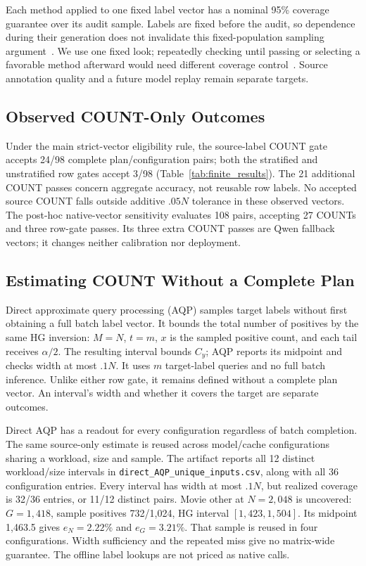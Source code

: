 Each method applied to one fixed label vector has a nominal 95\% coverage guarantee over its audit sample. Labels are fixed before the audit, so dependence during their generation does not invalidate this fixed-population sampling argument~\cite{worcs}. We use one fixed look; repeatedly checking until passing or selecting a favorable method afterward would need different coverage control~\cite{bargain}. Source annotation quality and a future model replay remain separate targets.



\subsection{Observed COUNT-Only Outcomes}
\label{sec:audit_results}
Under the main strict-vector eligibility rule, the source-label COUNT gate accepts 24/98 complete plan/configuration pairs; both the stratified and unstratified row gates accept 3/98 (Table~\ref{tab:finite_results}). The 21 additional COUNT passes concern aggregate accuracy, not reusable row labels. No accepted source COUNT falls outside additive $.05N$ tolerance in these observed vectors. The post-hoc native-vector sensitivity evaluates 108 pairs, accepting 27 COUNTs and three row-gate passes. Its three extra COUNT passes are Qwen fallback vectors; it changes neither calibration nor deployment.



\subsection{Estimating COUNT Without a Complete Plan}
Direct approximate query processing (AQP) samples target labels without first obtaining a full batch label vector. It bounds the total number of positives by the same HG inversion: $M=N$, $t=m$, $x$ is the sampled positive count, and each tail receives $\alpha/2$. The resulting interval bounds $C_y$; AQP reports its midpoint and checks width at most $.1N$. It uses $m$ target-label queries and no full batch inference. Unlike either row gate, it remains defined without a complete plan vector. An interval's width and whether it covers the target are separate outcomes.


Direct AQP has a readout for every configuration regardless of batch completion. The same source-only estimate is reused across model/cache configurations sharing a workload, size and sample. The artifact reports all 12 distinct workload/size intervals in \texttt{direct\_AQP\_unique\_inputs.csv}, along with all 36 configuration entries. Every interval has width at most $.1N$, but realized coverage is 32/36 entries, or 11/12 distinct pairs. Movie other at $N=2,048$ is uncovered: $G=1,418$, sample positives 732/1,024, HG interval $[1,423,1,504]$. Its midpoint 1,463.5 gives $e_N=2.22\%$ and $e_G=3.21\%$. That sample is reused in four configurations. Width sufficiency and the repeated miss give no matrix-wide guarantee. The offline label lookups are not priced as native calls.

